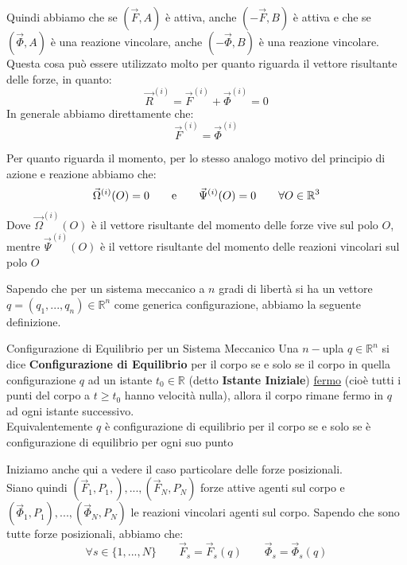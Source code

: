 \documentclass[11pt,a4paper,twoside]{article}
\theoremstyle{definition}
\begin{document}
\begin{center}
\end{center}

Quindi abbiamo che se $(\vec F, A)$ è attiva, anche $(-\vec F, B)$ è attiva e che se $(\vec \Phi, A)$ è una reazione vincolare, anche $(- \vec \Phi, B)$ è una reazione vincolare. Questa cosa può essere utilizzato molto per quanto riguarda il vettore risultante delle forze, in quanto:
\[ \vec R^{(i)} = \vec F^{(i)} + \vec\Phi^{(i)} = 0 \]
In generale abbiamo direttamente che:
\[ \vec F^{(i)} = \vec \Phi^{(i)} \]

Per quanto riguarda il momento, per lo stesso analogo motivo del principio di azione e reazione abbiamo che:
\[ \vec\Omega^{(i)}(O) = 0\qquad \text e \qquad \vec \Psi^{(i)}(O) = 0\qquad \forall O \in \mathbb R^3 \]
Dove $\vec \Omega^{(i)}(O)$ è il vettore risultante del momento delle forze vive sul polo $O$, mentre $\vec \Psi^{(i)}(O)$ è il vettore risultante del momento delle reazioni vincolari sul polo $O$

Sapendo che per un sistema meccanico a $n$ gradi di libertà si ha un vettore $q = (q_1,...,q_n) \in \mathbb R^n$ come generica configurazione, abbiamo la seguente definizione.

\begin{defn}{Configurazione di Equilibrio per un Sistema Meccanico}{}
	Una $n-$upla $q \in \mathbb R^n$ si dice \textbf{Configurazione di Equilibrio} per il corpo se e solo se il corpo in quella configurazione $q$ ad un istante $t_0 \in \mathbb R$ (detto \textbf{Istante Iniziale}) \underline{fermo} (cioè tutti i punti del corpo a $t \geq t_0$ hanno velocità nulla), allora il corpo rimane fermo in $q$ ad ogni istante successivo.\\
	Equivalentemente $q$ è configurazione di equilibrio per il corpo se e solo se è configurazione di equilibrio per ogni suo punto
\end{defn}

Iniziamo anche qui a vedere il caso particolare delle forze posizionali.\\
Siano quindi $(\vec F_1,P_1,),...,(\vec F_N, P_N)$ forze attive agenti sul corpo e $(\vec \Phi_1,P_1),...,(\vec \Phi_N, P_N)$ le reazioni vincolari agenti sul corpo. Sapendo che sono tutte forze posizionali, abbiamo che:
\[ \forall s \in \{1,...,N\}\qquad \vec F_s = \vec F_s(q)\qquad \vec \Phi_s = \vec \Phi_s(q) \]
\end{document}
